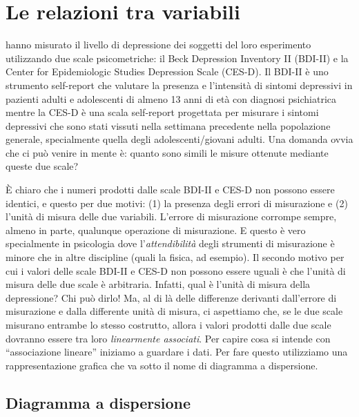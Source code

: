 \documentclass[
  10pt,
  italian,
  a4paper,
  extrafontsizes,onecolumn,openright
  ]{memoir}
\theoremstyle{definition}
\theoremstyle{definition}
\theoremstyle{definition}
\theoremstyle{definition}
\theoremstyle{remark}
\begin{document}
\hypertarget{le-relazioni-tra-variabili}{%
\section{Le relazioni tra variabili}\label{le-relazioni-tra-variabili}}

\textcite{zetschefuture2019} hanno misurato il livello di depressione dei
soggetti del loro esperimento utilizzando due scale psicometriche: il
Beck Depression Inventory II (BDI-II) e la Center for Epidemiologic
Studies Depression Scale (CES-D). Il BDI-II è uno strumento self-report
che valutare la presenza e l'intensità di sintomi depressivi in pazienti
adulti e adolescenti di almeno 13 anni di età con diagnosi psichiatrica
mentre la CES-D è una scala self-report progettata per misurare i
sintomi depressivi che sono stati vissuti nella settimana precedente
nella popolazione generale, specialmente quella degli
adolescenti/giovani adulti. Una domanda ovvia che ci può venire in
mente è: quanto sono simili le misure ottenute mediante queste due
scale?

È chiaro che i numeri prodotti dalle scale BDI-II e CES-D non possono
essere identici, e questo per due motivi: (1) la presenza degli errori
di misurazione e (2) l'unità di misura delle due variabili. L'errore di
misurazione corrompe sempre, almeno in parte, qualunque operazione di
misurazione. E questo è vero specialmente in psicologia dove
l'\emph{attendibilità} degli strumenti di misurazione è minore che in altre
discipline (quali la fisica, ad esempio). Il secondo motivo per cui i
valori delle scale BDI-II e CES-D non possono essere uguali è che
l'unità di misura delle due scale è arbitraria. Infatti, qual è l'unità
di misura della depressione? Chi può dirlo! Ma, al di là delle
differenze derivanti dall'errore di misurazione e dalla differente unità
di misura, ci aspettiamo che, se le due scale misurano entrambe lo
stesso costrutto, allora i valori prodotti dalle due scale dovranno
essere tra loro \emph{linearmente associati}. Per capire cosa si intende con
``associazione lineare'' iniziamo a guardare i dati. Per fare questo
utilizziamo una rappresentazione grafica che va sotto il nome di
diagramma a dispersione.

\hypertarget{diagramma-a-dispersione}{%
\subsection{Diagramma a dispersione}\label{diagramma-a-dispersione}}
\end{document}
